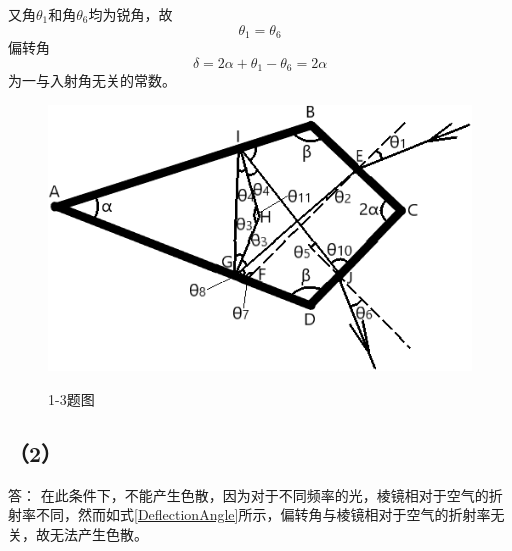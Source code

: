 \documentclass[10pt,a4paper]{article}
\theoremstyle{remark}
\begin{document}
又角$\theta_1$和角$\theta_6$均为锐角，故
\[
\theta_1 = \theta_6
\]
偏转角
\begin{equation}
\label{DeflectionAngle}
\delta = 2\alpha + \theta_1 - \theta_6 = 2\alpha
\end{equation}
为一与入射角无关的常数。
\begin{figure}[h]
\centering
\includegraphics[scale = .8]{FigureofProblem1-3.png}\\
\caption{1-3题图}\label{FigureofProblem1-3}
\end{figure}
\subsection*{（2）}答：
在此条件下，不能产生色散，因为对于不同频率的光，棱镜相对于空气的折射率不同，然而如式\ref{DeflectionAngle}所示，偏转角与棱镜相对于空气的折射率无关，故无法产生色散。
\end{document}
